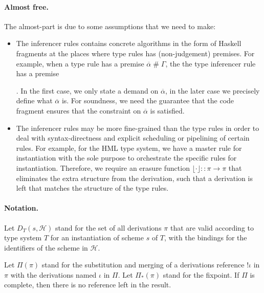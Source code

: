 \documentclass[preprint,natbib]{sigplanconf}
\newcommand{\Varid}[1]{\mathit{#1}}
\def\resethooks{%
  \global\let\SaveRestoreHook\empty
  \global\let\ColumnHook\empty}
\newcommand\SchemeName{s}
\newcommand\Heap{\mathcal{H}}
\newcommand\Deriv{\pi}
\newcommand\DerivsEnv{\Pi}
\newcommand\RuleIdent{\iota}
\newcommand\derivref[1]{!#1}
\newcommand\erasure[1]{\lfloor #1 \rfloor}
\begin{document}
  \paragraph{Almost free.}
  The almost-part is due to some assumptions that we need to make:
  \begin{itemize}
  \item The inferencer rules contains concrete algorithms in the form of Haskell fragments at the
     places where type rules has (non-judgement) premises. For example, when a type rule has a
     premise $\overline{\alpha} \;\#\; \Gamma$, the the type inferencer rule has a premise
     \begin{hscode}\SaveRestoreHook
{}
\>[6]{}\;\overline{\alpha}\mathrel{=}\Varid{ftv}\;\Varid{ty}\mathbin{-}\Varid{ftv}\;\Gamma{}\<[E]
\ColumnHook
\end{hscode}\resethooks
. In the first case, we only state a demand on $\overline{\alpha}$, in the later
     case we precisely define what $\overline{\alpha}$ is. For soundness, we need the guarantee
     that the code fragment ensures that the constraint on $\overline{\alpha}$ is satisfied.
  \item The inferencer rules may be more fine-grained than the type rules in order to deal with
     syntax-directness and explicit scheduling or pipelining of certain rules. For example, 
     for the HML type system, we have a master rule for instantiation with the sole purpose to
     orchestrate the specific rules for instantiation.
     Therefore, we require an erasure function $\erasure{\cdotp} :: \Deriv \rightarrow \Deriv$ that
     eliminates the extra structure from the derivation, such that a derivation is left that
     matches the structure of the type rules.
  \end{itemize}

  \paragraph{Notation.}
  Let $D_T(\SchemeName, \Heap)$ stand for the set of all derivations $\Deriv$ that
  are valid according to type system $T$ for an instantiation of scheme $\SchemeName$ of $T$, 
  with the bindings for the identifiers of the scheme in $\Heap$.
  
  Let $\DerivsEnv(\Deriv)$ stand for the substitution and merging of a derivations reference
  $\derivref{\RuleIdent}$ in $\Deriv$ with the derivations named $\RuleIdent$ in
  $\DerivsEnv$. Let $\DerivsEnv_{*}(\Deriv)$ stand for the fixpoint. If $\DerivsEnv$ is complete,
  then there is no reference left in the result.
\end{document}
